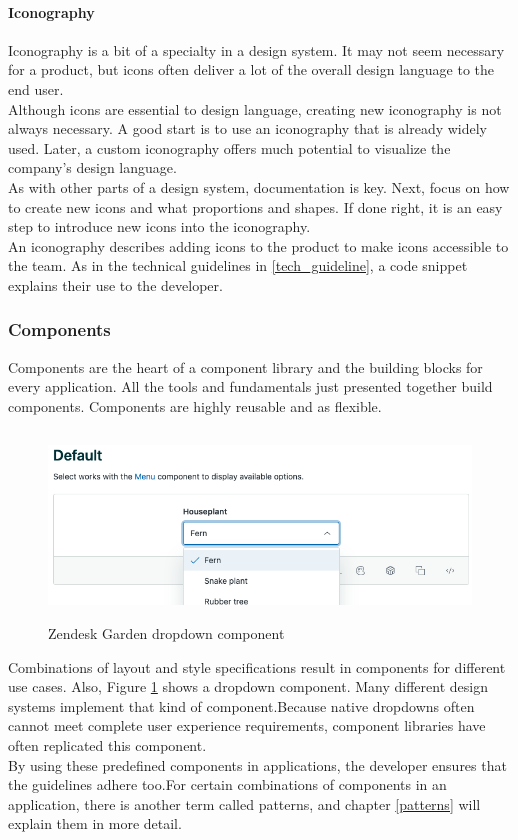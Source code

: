 \paragraph{Iconography}
Iconography is a bit of a specialty in a design system. It may not seem necessary for a product, but icons often deliver a lot of the overall design language to the end user. \\
Although icons are essential to design language, creating new iconography is not always necessary. A good start is to use an iconography that is already widely used. Later, a custom iconography offers much potential to visualize the company’s design language. \\
As with other parts of a design system, documentation is key. Next, focus on how to create new icons and what proportions and shapes. If done right, it is an easy step to introduce new icons into the iconography. 
\\
An iconography describes adding icons to the product to make icons accessible to the team. As in the technical guidelines in \ref{tech_guideline}, a code snippet explains their use to the developer. \cite{vesselov_building_2019}

\subsubsection{Components}
Components are the heart of a component library and the building blocks for every application. All the tools and fundamentals just presented together build components. Components are highly reusable and as flexible.  \\
\begin{figure}[hbtp]
	\centerline{\includegraphics[height=5cm]{images/zendesk_component_example.png}}
	\caption{Zendesk Garden dropdown component \cite{zendesk_garden_zendesk_nodate}}
	\label{zen_garden_component}
\end{figure}

Combinations of layout and style specifications result in components for different use cases. Also, Figure \ref{zen_garden_component} shows a dropdown component. Many different design systems implement that kind of component.Because native dropdowns often cannot meet complete user experience requirements, component libraries have often replicated this component. \\
By using these predefined components in applications, the developer ensures that the guidelines adhere too.For certain combinations of components in an application, there is another term called patterns, and chapter \ref{patterns} will explain them in more detail. \\

